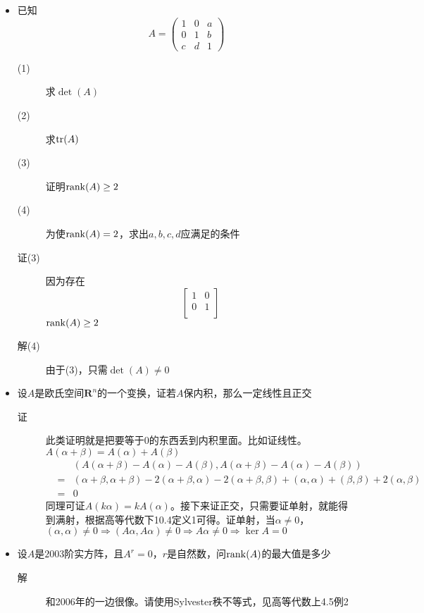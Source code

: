 \begin{itemize}
\item 已知
\[
A=\left(
\begin{array}{ccc}
1 & 0 & a\\
0 & 1 & b \\
c & d &1 
\end{array}
\right)
\]
\begin{description}
\item[(1)] 求$\det(A)$
\item[(2)] 求$\operatorname{tr}(A)$
\item[(3)] 证明$\operatorname{rank}(A)\geq 2$
\item[(4)] 为使$\operatorname{rank}(A)=2$，求出$a,b,c,d$应满足的条件
\item[证(3)] 因为存在
\[
\left[
\begin{array}{cc}
1 & 0 \\
0 & 1 \\
\end{array}
\right]
\]
$\operatorname{rank}(A)\geq 2$
\item[解(4)] 由于(3)，只需$\det(A)\neq 0$
\end{description}

\item 设$A$是欧氏空间$\mathbf{R}^n$的一个变换，证若$A$保内积，那么一定线性且正交
\begin{description}
\item[证] 此类证明就是把要等于0的东西丢到内积里面。比如证线性。$A(\alpha+\beta)=A(\alpha)+A(\beta)$
\begin{eqnarray*}
& &(A(\alpha+\beta)-A(\alpha)-A(\beta),A(\alpha+\beta)-A(\alpha)-A(\beta))\\
& = & (\alpha+\beta,\alpha+\beta)-2(\alpha+\beta,\alpha)-2(\alpha+\beta,\beta)+(\alpha,\alpha)+(\beta,\beta)+2(\alpha,\beta)\\
& = & 0
\end{eqnarray*}
同理可证$A(k\alpha)=kA(\alpha)$。接下来证正交，只需要证单射，就能得到满射，根据高等代数下10.4定义1可得。证单射，当$\alpha\neq 0$，$(\alpha,\alpha)\neq 0\Rightarrow(A\alpha,A\alpha)\neq 0\Rightarrow A\alpha\neq 0\Rightarrow\ker A=0$
\end{description}

\item 设$A$是$2003$阶实方阵，且$A^r=0$，$r$是自然数，问$\operatorname{rank}(A)$的最大值是多少
\begin{description}
\item[解] 和2006年的一边很像。请使用Sylvester秩不等式，见高等代数上4.5例2
\end{description}


\end{itemize}
